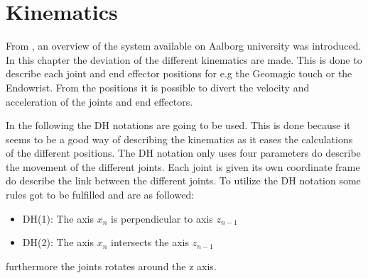 \chapter{Kinematics}\label{cha:kinematic}

From , an overview of the system available on Aalborg university was introduced. In this chapter the deviation of the different kinematics are made. This is done to describe each joint and end effector positions for e.g the Geomagic touch or the Endowrist. From the positions it is possible to divert the velocity and acceleration of the joints and end effectors.

In the following the \gls{DH} notations are going to be used. This is done because it seems to be a good way of describing the kinematics as it eases the calculations of the different positions. The \gls{DH} notation only uses four parameters do describe the movement of the different joints. Each joint is given its own coordinate frame do describe the link between the different joints. To utilize the \gls{DH} notation some rules got to be fulfilled and are as followed:

\begin{itemize}
\item DH(1): The axis $x_n$ is perpendicular to axis $z_{n-1}$
\item DH(2): The axis $x_n$ intersects the axis $z_{n-1}$
\end{itemize}

furthermore the joints rotates around the z axis.




